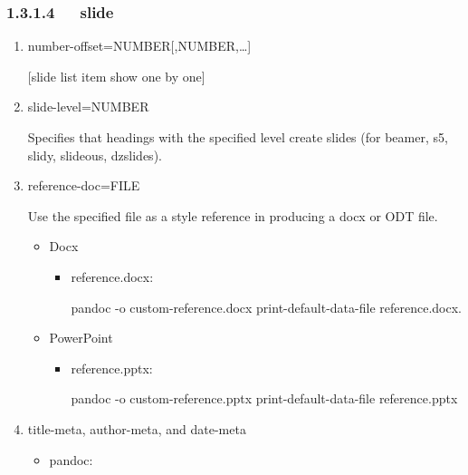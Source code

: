 \documentclass[letterpaper,12pt,english]{sphinxmanual}
\begin{document}
\subsubsection{1.3.1.4   slide}
\label{\detokenize{001software/001install/pandoc:slide}}\begin{enumerate}
%
\item {} 
\textendash{}number-offset=NUMBER{[},NUMBER,…{]}

{[}slide list item show one by one{]}

\item {} 
\textendash{}slide-level=NUMBER

Specifies that headings with the specified level create slides (for
beamer, s5, slidy, slideous, dzslides).

\item {} 
\textendash{}reference-doc=FILE

Use the specified file as a style reference in producing a docx or
ODT file.
\begin{itemize}
\item {} 
Docx
\begin{itemize}
\item {} 
reference.docx:

pandoc -o custom-reference.docx \textendash{}print-default-data-file
reference.docx.

\end{itemize}

\item {} 
PowerPoint
\begin{itemize}
\item {} 
reference.pptx:

pandoc -o custom-reference.pptx \textendash{}print-default-data-file
reference.pptx

\end{itemize}

\end{itemize}

\item {} 
title-meta, author-meta, and date-meta
\begin{itemize}
\item {} 
pandoc:

\begin{sphinxVerbatim}[commandchars=\\\{\}]
 
    
 


\end{sphinxVerbatim}
\end{itemize}
\end{enumerate}
\end{document}
